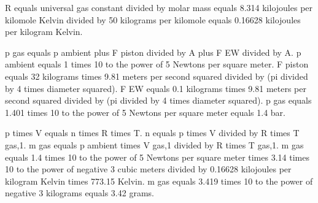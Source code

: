R equals universal gas constant divided by molar mass equals 8.314 kilojoules per kilomole Kelvin divided by 50 kilograms per kilomole equals 0.16628 kilojoules per kilogram Kelvin.  

p gas equals p ambient plus F piston divided by A plus F EW divided by A.  
p ambient equals 1 times 10 to the power of 5 Newtons per square meter.  
F piston equals 32 kilograms times 9.81 meters per second squared divided by (pi divided by 4 times diameter squared).  
F EW equals 0.1 kilograms times 9.81 meters per second squared divided by (pi divided by 4 times diameter squared).  
p gas equals 1.401 times 10 to the power of 5 Newtons per square meter equals 1.4 bar.  

p times V equals n times R times T.  
n equals p times V divided by R times T gas,1.  
m gas equals p ambient times V gas,1 divided by R times T gas,1.  
m gas equals 1.4 times 10 to the power of 5 Newtons per square meter times 3.14 times 10 to the power of negative 3 cubic meters divided by 0.16628 kilojoules per kilogram Kelvin times 773.15 Kelvin.  
m gas equals 3.419 times 10 to the power of negative 3 kilograms equals 3.42 grams.